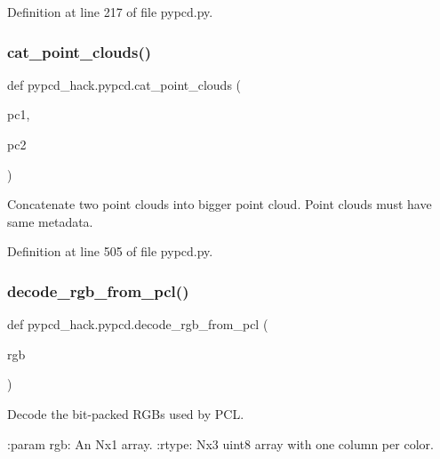 Definition at line 217 of file pypcd.\+py.

\mbox{\label{namespacepypcd__hack_1_1pypcd_a8fb9fd1977dac6b877b2d3f8f43388f9}} 
\subsubsection{\texorpdfstring{cat\+\_\+point\+\_\+clouds()}{cat\_point\_clouds()}}
{\footnotesize\ttfamily def pypcd\+\_\+hack.\+pypcd.\+cat\+\_\+point\+\_\+clouds (\begin{DoxyParamCaption}\item[{}]{pc1,  }\item[{}]{pc2 }\end{DoxyParamCaption})}

\begin{DoxyVerb}Concatenate two point clouds into bigger point cloud.
Point clouds must have same metadata.
\end{DoxyVerb}
 

Definition at line 505 of file pypcd.\+py.

\mbox{\label{namespacepypcd__hack_1_1pypcd_a71f4e506eeb77e5514c7d1ce1d8130b8}} 
\subsubsection{\texorpdfstring{decode\+\_\+rgb\+\_\+from\+\_\+pcl()}{decode\_rgb\_from\_pcl()}}
{\footnotesize\ttfamily def pypcd\+\_\+hack.\+pypcd.\+decode\+\_\+rgb\+\_\+from\+\_\+pcl (\begin{DoxyParamCaption}\item[{}]{rgb }\end{DoxyParamCaption})}

\begin{DoxyVerb}Decode the bit-packed RGBs used by PCL.

:param rgb: An Nx1 array.
:rtype: Nx3 uint8 array with one column per color.
\end{DoxyVerb}
 

